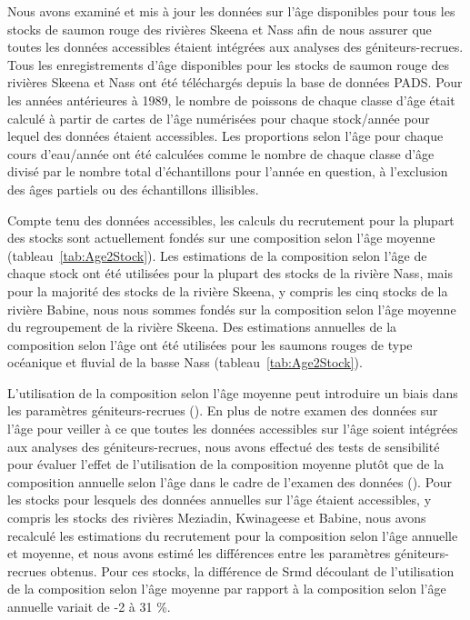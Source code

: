 \documentclass[french,11pt]{book}
\begin{document}
Nous avons examiné et mis à jour les données sur l'âge disponibles pour tous les stocks de saumon rouge des rivières Skeena et Nass afin de nous assurer que toutes les données accessibles étaient intégrées aux analyses des géniteurs-recrues. Tous les enregistrements d'âge disponibles pour les stocks de saumon rouge des rivières Skeena et Nass ont été téléchargés depuis la base de données PADS. Pour les années antérieures à 1989, le nombre de poissons de chaque classe d'âge était calculé à partir de cartes de l'âge numérisées pour chaque stock/année pour lequel des données étaient accessibles. Les proportions selon l'âge pour chaque cours d'eau/année ont été calculées comme le nombre de chaque classe d'âge divisé par le nombre total d'échantillons pour l'année en question, à l'exclusion des âges partiels ou des échantillons illisibles.

Compte tenu des données accessibles, les calculs du recrutement pour la plupart des stocks sont actuellement fondés sur une composition selon l'âge moyenne (tableau~\ref{tab:Age2Stock}). Les estimations de la composition selon l'âge de chaque stock ont été utilisées pour la plupart des stocks de la rivière Nass, mais pour la majorité des stocks de la rivière Skeena, y compris les cinq stocks de la rivière Babine, nous nous sommes fondés sur la composition selon l'âge moyenne du regroupement de la rivière Skeena. Des estimations annuelles de la composition selon l'âge ont été utilisées pour les saumons rouges de type océanique et fluvial de la basse Nass (tableau~\ref{tab:Age2Stock}).

L'utilisation de la composition selon l'âge moyenne peut introduire un biais dans les paramètres géniteurs-recrues (). En plus de notre examen des données sur l'âge pour veiller à ce que toutes les données accessibles sur l'âge soient intégrées aux analyses des géniteurs-recrues, nous avons effectué des tests de sensibilité pour évaluer l'effet de l'utilisation de la composition moyenne plutôt que de la composition annuelle selon l'âge dans le cadre de l'examen des données (). Pour les stocks pour lesquels des données annuelles sur l'âge étaient accessibles, y compris les stocks des rivières Meziadin, Kwinageese et Babine, nous avons recalculé les estimations du recrutement pour la composition selon l'âge annuelle et moyenne, et nous avons estimé les différences entre les paramètres géniteurs-recrues obtenus. Pour ces stocks, la différence de Srmd découlant de l'utilisation de la composition selon l'âge moyenne par rapport à la composition selon l'âge annuelle variait de -2 à 31 \%.
\end{document}
